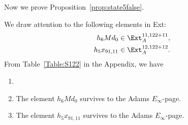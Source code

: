 \documentclass{amsart}
\numberwithin{equation}{section}
\begin{document}
Now we prove Proposition~\ref{prop:state5false}.

We draw attention to the following elements in Ext:
\begin{align*}
h_6 M d_0 & \in \Ext_A^{11,122+11}, \\
h_5x_{91,11} & \in \Ext_A^{12,122+12}.
\end{align*}
From Table~\ref{Table:S122} in the Appendix, we have
\begin{fact} \label{fact:stem122}
\begin{enumerate}
    \item[] 
    \item The element $h_6 M d_0$ survives to the Adams $E_\infty$-page.
    \item The element $h_5x_{91,11}$ survives to the Adams $E_\infty$-page.
\end{enumerate}
    
\end{fact}
\end{document}
